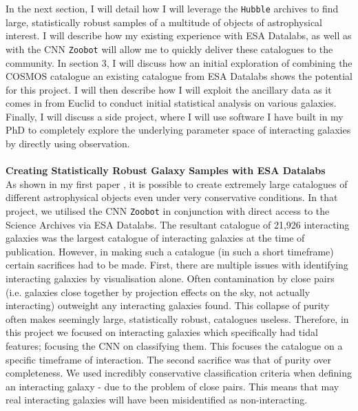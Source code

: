 \documentclass[11pt,usenatbib]{article}
\begin{document}
In the next section, I will detail how I will leverage the \texttt{Hubble} archives to find large, statistically robust samples of a multitude of objects of astrophysical interest. I will describe how my existing experience with ESA Datalabs, as well as with the CNN \texttt{Zoobot} will allow me to quickly deliver these catalogues to the community. In section 3, I will discuss how an initial exploration of combining the COSMOS catalogue an existing catalogue from ESA Datalabs shows the potential for this project. I will then describe how I will exploit the ancillary data as it comes in from Euclid to conduct initial statistical analysis on various galaxies. Finally, I will discuss a side project, where I will use software I have built in my PhD to completely explore the underlying parameter space of interacting galaxies by directly using observation.
\\
\\
\noindent \textbf{Creating Statistically Robust Galaxy Samples with ESA Datalabs} \\
As shown in my first paper \citep{O'Ryan}, it is possible to create extremely large catalogues of different astrophysical objects even under very conservative conditions. In that project, we utilised the CNN \texttt{Zoobot} in conjunction with direct access to the  Science Archives via ESA Datalabs. The resultant catalogue of 21,926 interacting galaxies was the largest catalogue of interacting galaxies at the time of publication. However, in making such a catalogue (in such a short timeframe) certain sacrifices had to be made. First, there are multiple issues with identifying interacting galaxies by visualisation alone. Often contamination by close pairs (i.e. galaxies close together by projection effects on the sky, not actually interacting) outweight any interacting galaxies found. This collapse of purity often makes seemingly large, statistically robust, catalogues useless. Therefore, in this project we focused on interacting galaxies which specifically had tidal features; focusing the CNN on classifying them. This focuses the catalogue on a specific timeframe of interaction. The second sacrifice was that of purity over completeness. We used incredibly conservative classification criteria when defining an interacting galaxy - due to the problem of close pairs. This means that may real interacting galaxies will have been misidentified as non-interacting.
\end{document}
